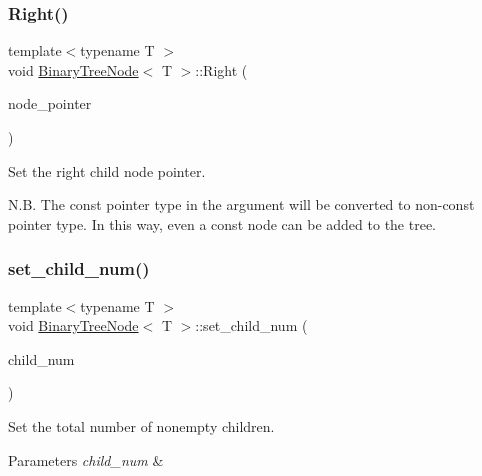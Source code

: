 \mbox{\label{classBinaryTreeNode_add14f066fd229ef84f334110ebc0061f}} 
\subsubsection{\texorpdfstring{Right()}{Right()}\hspace{0.1cm}{\footnotesize\ttfamily [2/2]}}
{\footnotesize\ttfamily template$<$typename T $>$ \\
void \hyperlink{classBinaryTreeNode}{Binary\+Tree\+Node}$<$ T $>$\+::Right (\begin{DoxyParamCaption}\item[{const \hyperlink{classBinaryTreeNode}{Binary\+Tree\+Node}$<$ T $>$ $\ast$}]{node\+\_\+pointer }\end{DoxyParamCaption})}

Set the right child node pointer.

N.\+B. The const pointer type in the argument will be converted to non-\/const pointer type. In this way, even a const node can be added to the tree. \mbox{\label{classBinaryTreeNode_ae9c5a478fed2c72e7aa9f2b28a0010e7}} 
\subsubsection{\texorpdfstring{set\+\_\+child\+\_\+num()}{set\_child\_num()}}
{\footnotesize\ttfamily template$<$typename T $>$ \\
void \hyperlink{classBinaryTreeNode}{Binary\+Tree\+Node}$<$ T $>$\+::set\+\_\+child\+\_\+num (\begin{DoxyParamCaption}\item[{const unsigned int}]{child\+\_\+num }\end{DoxyParamCaption})}

Set the total number of nonempty children. 
\begin{DoxyParams}{Parameters}
{\em child\+\_\+num} & \\
\hline
\end{DoxyParams}
\mbox{\label{classBinaryTreeNode_a37f0dd5197e454f14e3e99c85ab516eb}} 
